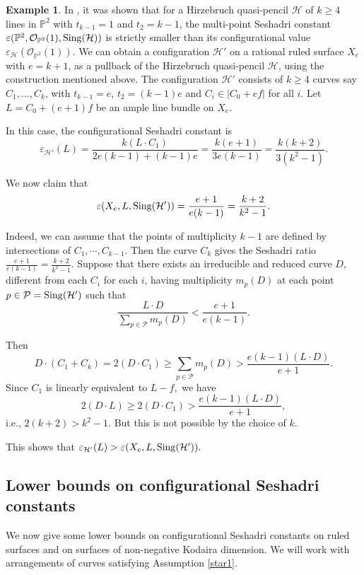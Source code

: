 \documentclass[12pt,reqno]{amsart}
\theoremstyle{plain}
\numberwithin{equation}{section}
\theoremstyle{definition}
\newtheorem{example}[theorem]{Example}
\begin{document}
\begin{example}
In \cite[Example 3.1]{JP}, it was shown that for a Hirzebruch quasi-pencil $\mathcal{H}$ of $k\geq 4$ lines in $\mathbb{P}^2$ with $t_{k-1}=1$ and $t_2=k-1$, the multi-point Seshadri constant $\varepsilon(\mathbb{P}^2, \mathcal{O}_{\mathbb{P}^2}(1),{\rm Sing}(\mathcal{H}))$ is strictly smaller than its configurational value $\varepsilon_{\mathcal{H}}(\mathcal{O}_{\mathbb{P}^2}(1)).$ We can obtain a configuration $\mathcal{H}'$ on a rational ruled surface $X_e$ with $e=k+1$, as a pullback of the Hirzebruch quasi-pencil $\mathcal{H}$, using the construction mentioned above. The configuration $\mathcal{H}'$ consists of $k \geq 4$ curves say $C_{1}, \ldots, C_{k}$, with $t_{k-1}=e$, $t_2=(k-1)e$ and $ C_i \in |C_0+ef|$ for all $i.$ Let $L=C_0+(e+1)f$ be an ample line bundle on $X_e.$ 

In this case, the configurational Seshadri constant is 
	$$	\varepsilon_{\mathcal{H}'}(L)= \frac{k(L\cdot C_1)}{2e(k-1)+(k-1)e}= \frac{k(e+1)}{3e(k-1)}=\frac{k(k+2)}{3(k^2-1)}.$$

We now claim that 
	$$\varepsilon(X_e, L,{\rm Sing}(\mathcal{H}')) = \frac{e+1}{e(k-1)}=\frac{k+2}{k^2-1}.$$ 
	
	Indeed, we can assume that the points of multiplicity $k-1$ are defined by intersections of $C_1, \cdots, C_{k-1}$. Then the curve $C_k$ gives the Seshadri ratio $\frac{e+1}{e(k-1)}=\frac{k+2}{k^2-1}.$  Suppose that there exists an irreducible and reduced curve $D$, different from each $C_{i}$ for each $i$, having multiplicity $m_{p}(D)$ at each point $p \in \mathcal{P}={\rm Sing}(\mathcal{H}')$ such that
	\begin{equation*}
		\frac{L \cdot D}{\sum_{p \in \mathcal{P}} m_{p}(D)} < \frac{e+1}{e(k-1)}.		
\end{equation*}

Then 
$$D \cdot (C_1+C_k)=2 (D \cdot C_1) \geq \sum_{p \in \mathcal{P}} m_{p}(D) > \frac{e(k-1)(L \cdot D)}{e+1}.$$
Since $C_1$ is linearly equivalent to $L-f, $ we have $$2(D \cdot L) \geq 2(D \cdot C_{1})> \frac{e(k-1)(L \cdot D)}{e+1},$$ i.e., 
$2(k+2) > k^2-1.$ But this is not possible by the choice of $k$. 

	
	
	
	This shows that $\varepsilon_{\mathcal{H}'}(L) > \varepsilon(X_e, L,{\rm Sing}(\mathcal{H}')).$
\end{example}



\subsection{Lower bounds on configurational Seshadri constants}\label{bounds}
We now give some lower bounds on configurational Seshadri constants on ruled surfaces and on surfaces of non-negative Kodaira dimension.	We will 
work with arrangements of curves satisfying Assumption \ref{star1}. 
\end{document}
